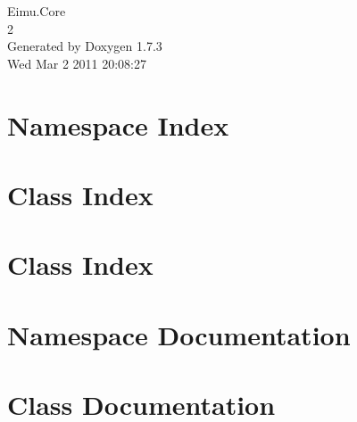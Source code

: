 \documentclass[a4paper]{book}
\begin{document}
\hypersetup{pageanchor=false}
\begin{titlepage}
\vspace*{7cm}
\begin{center}
{\Large Eimu.Core \\[1ex]\large 2 }\\
\vspace*{1cm}
{\large Generated by Doxygen 1.7.3}\\
\vspace*{0.5cm}
{\small Wed Mar 2 2011 20:08:27}\\
\end{center}
\end{titlepage}
\clearemptydoublepage
{}
\tableofcontents
\clearemptydoublepage
{}
\hypersetup{pageanchor=true}
\chapter{Namespace Index}

\chapter{Class Index}

\chapter{Class Index}

\chapter{Namespace Documentation}





\chapter{Class Documentation}



















\printindex
\end{document}
